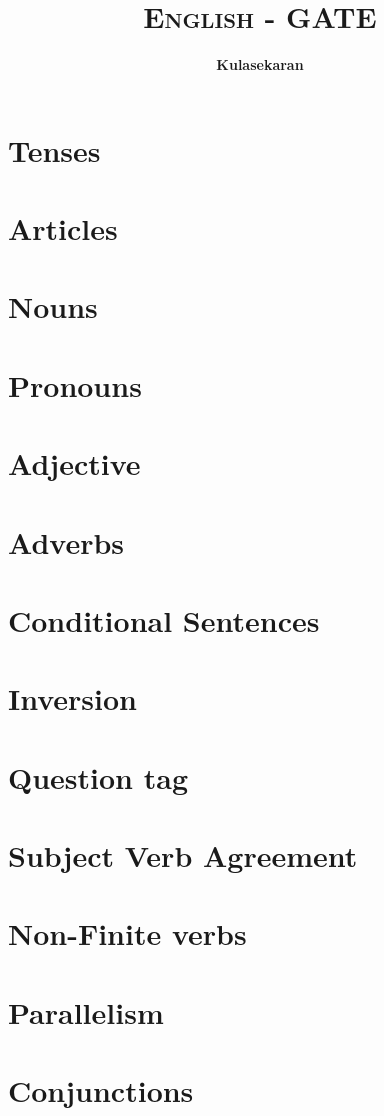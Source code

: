 \documentclass[8pt]{report}
\title{\Huge{\textsc{English - GATE}}}
\author{\huge{\textbf{Kulasekaran}}}
\begin{document}
\maketitle
\tableofcontents
\chapter{Tenses}
\chapter{Articles}
\chapter{Nouns}
\chapter{Pronouns}
\chapter{Adjective}
\chapter{Adverbs}
\chapter{Conditional Sentences}
\chapter{Inversion}
\chapter{Question tag}
\chapter{Subject Verb Agreement}
\chapter{Non-Finite verbs}
\chapter{Parallelism}
\chapter{Conjunctions}
\end{document}
